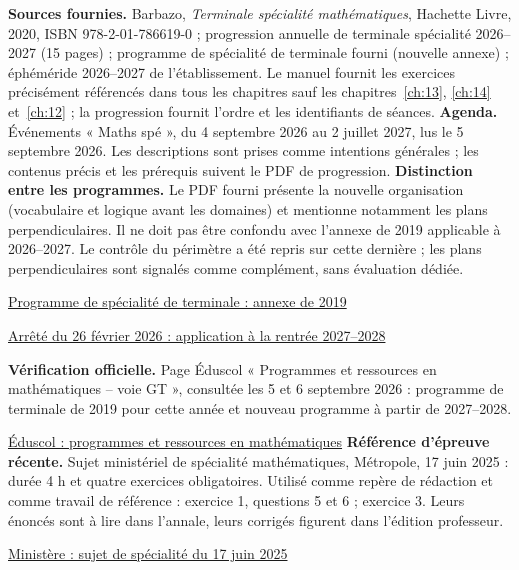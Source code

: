 \textbf{Sources fournies.} Barbazo, \emph{Terminale spécialité mathématiques}, Hachette Livre, 2020, ISBN 978-2-01-786619-0 ; progression annuelle de terminale spécialité 2026--2027 (15 pages) ; programme de spécialité de terminale fourni (nouvelle annexe) ; éphéméride 2026--2027 de l'établissement. Le manuel fournit les exercices précisément référencés dans tous les chapitres sauf les chapitres~\ref{ch:13}, \ref{ch:14} et~\ref{ch:12} ; la progression fournit l'ordre et les identifiants de séances.
\textbf{Agenda.} Événements « Maths spé », du 4 septembre 2026 au 2 juillet 2027, lus le 5 septembre 2026. Les descriptions sont prises comme intentions générales ; les contenus précis et les prérequis suivent le PDF de progression.
\textbf{Distinction entre les programmes.} Le PDF fourni présente la nouvelle organisation (vocabulaire et logique avant les domaines) et mentionne notamment les plans perpendiculaires. Il ne doit pas être confondu avec l'annexe de 2019 applicable à 2026--2027. Le contrôle du périmètre a été repris sur cette dernière ; les plans perpendiculaires sont signalés comme complément, sans évaluation dédiée.\par
\href{https://eduscol.education.gouv.fr/sites/default/files/document/spe246annexe1158907pdf-84159.pdf}{Programme de spécialité de terminale : annexe de 2019}\par
\href{https://www.education.gouv.fr/bo/2026/Hebdo14/MENE2602919A}{Arrêté du 26 février 2026 : application à la rentrée 2027--2028}\par
\textbf{Vérification officielle.} Page Éduscol « Programmes et ressources en mathématiques -- voie GT », consultée les 5 et 6 septembre 2026 : programme de terminale de 2019 pour cette année et nouveau programme à partir de 2027--2028.\par
\href{https://eduscol.education.gouv.fr/5817/programmes-et-ressources-en-mathematiques-voie-gt}{Éduscol : programmes et ressources en mathématiques}
\textbf{Référence d'épreuve récente.} Sujet ministériel de spécialité mathématiques, Métropole, 17 juin 2025 : durée 4 h et quatre exercices obligatoires. Utilisé comme repère de rédaction et comme travail de référence : exercice 1, questions 5 et 6 ; exercice 3. Leurs énoncés sont à lire dans l'annale, leurs corrigés figurent dans l'édition professeur.\par
\href{https://www.education.gouv.fr/sites/default/files/2025-06/baccalaur-at-g-n-ral-2025-math-matiques-440856.pdf}{Ministère : sujet de spécialité du 17 juin 2025}
